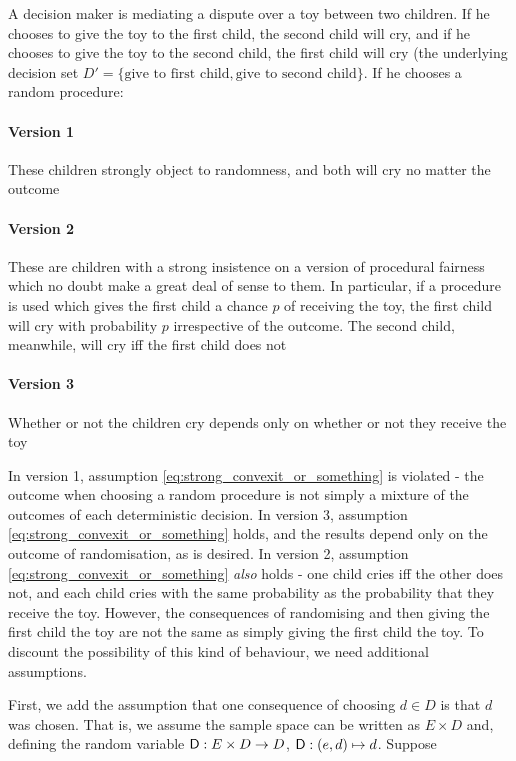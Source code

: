 \begin{example}
A decision maker is mediating a dispute over a toy between two children. If he chooses to give the toy to the first child, the second child will cry, and if he chooses to give the toy to the second child, the first child will cry (the underlying decision set $D'=\{\text{give to first child}, \text{give to second child}\}$. If he chooses a random procedure:

\paragraph{Version 1} These children strongly object to randomness, and both will cry no matter the outcome
\paragraph{Version 2} These are children with a strong insistence on a version of procedural fairness which no doubt make a great deal of sense to them. In particular, if a procedure is used which gives the first child a chance $p$ of receiving the toy, the first child will cry with probability $p$ irrespective of the outcome. The second child, meanwhile, will cry iff the first child does not
\paragraph{Version 3} Whether or not the children cry depends only on whether or not they receive the toy
\end{example}

In version 1, assumption \ref{eq:strong_convexit_or_something} is violated - the outcome when choosing a random procedure is not simply a mixture of the outcomes of each deterministic decision. In version 3, assumption \ref{eq:strong_convexit_or_something} holds, and the results depend only on the outcome of randomisation, as is desired. In version 2, assumption \ref{eq:strong_convexit_or_something} \emph{also} holds - one child cries iff the other does not, and each child cries with the same probability as the probability that they receive the toy. However, the consequences of randomising and then giving the first child the toy are not the same as simply giving the first child the toy. To discount the possibility of this kind of behaviour, we need additional assumptions. 

First, we add the assumption that one consequence of choosing $d\in D$ is that $d$ was chosen. That is, we assume the sample space can be written as $E\times D$ and, defining the random variable $\mathsf{D}:E\times D\to D$, $\mathsf{D}:(e,d)\mapsto d$. Suppose

